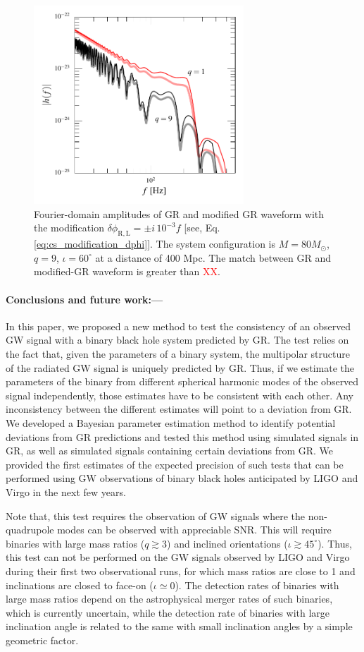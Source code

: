 \documentclass[prl,preprintnumbers,twocolumn,eqsecnum,floatfix,a4paper,nofootinbib,superscriptaddress]{revtex4}
\newcommand{\red}[1]{\textcolor{red}{#1}}
\begin{document}
\begin{figure}[h]
	\includegraphics*[width=3.1in]{figs/mod_GR_waveform.pdf}
	\caption{Fourier-domain amplitudes of GR and modified GR waveform with the modification $\delta \phi_\mathrm{R,L} = \pm i \, 10^{-3} f$ [see, Eq.\eqref{eq:cs_modification_dphi}]. The system configuration is $M = 80 M_{\odot}$, $q = 9$, $\iota=60^{\circ}$ at a distance of 400 Mpc. The match between GR and modified-GR waveform is greater than \red{XX}.}
\label{fig:mod_gr_waveform}
\end{figure}

\paragraph{Conclusions and future work:---} In this paper, we proposed a new method to test the consistency of an observed GW signal with a binary black hole system predicted by GR. The test relies on the fact that, given the parameters of a binary system, the multipolar structure of the radiated GW signal is uniquely predicted by GR. Thus, if we estimate the parameters of the binary from different spherical harmonic modes of the observed signal independently, those estimates have to be consistent with each other. Any inconsistency between the different estimates will point to a deviation from GR. We developed a Bayesian parameter estimation method to identify potential deviations from GR predictions and tested this method using simulated signals in GR, as well as simulated signals containing certain deviations from GR.  We provided the first estimates of the expected precision of such tests that can be performed using GW observations of binary black holes anticipated by LIGO and Virgo in the next few years. 

Note that, this test requires the observation of GW signals where the non-quadrupole modes can be observed with appreciable SNR. This will require binaries with large mass ratios ($q \gtrsim 3$) and inclined orientations ($\iota \gtrsim 45^{\circ}$). Thus, this test can not be performed on the GW signals observed by LIGO and Virgo during their first two observational runs, for which mass ratios are close to 1 and inclinations are closed to face-on ($\iota \simeq 0$). The detection rates of binaries with large mass ratios depend on the astrophysical merger rates of such binaries, which is currently uncertain, while the detection rate of binaries with large inclination angle is related to the same with small inclination angles by a simple geometric factor. 
\end{document}
